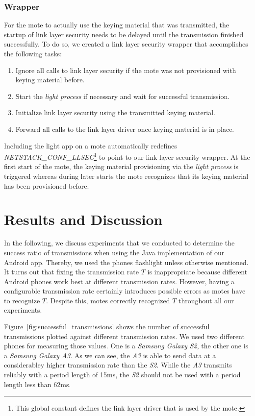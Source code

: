 \documentclass{ewsn-proc} %
\begin{document}
\subsubsection{Wrapper}
\label{ssub:contiki_driver_wrapper}

For the mote to actually use the keying material that was transmitted, the startup of link layer security needs to be delayed until the transmission finished successfully.
To do so, we created a link layer security wrapper that accomplishes the following tasks:

\begin{enumerate}
	\item Ignore all calls to link layer security if the mote was not provisioned with keying material before.
	\item Start the \textit{light process} if necessary and wait for successful transmission.
	\item Initialize link layer security using the transmitted keying material.
	\item Forward all calls to the link layer driver once keying material is in place.
\end{enumerate}

Including the light app on a mote automatically redefines \textit{NETSTACK\_CONF\_LLSEC}\footnote{This global constant defines the link layer driver that is used by the mote.} to point to our link layer security wrapper.
At the first start of the mote, the keying material provisioning via the \textit{light process} is triggered whereas during later starts the mote recognizes that its keying material has been provisioned before.


\section{Results and Discussion}
\label{sec:results_and_discussion}

In the following, we discuss experiments that we conducted to determine the success ratio of transmissions when using the Java implementation of our Android app.
Thereby, we used the phones flashlight unless otherwise mentioned.
It turns out that fixing the transmission rate $T$ is inappropriate because different Android phones work best at different transmission rates. 
However, having a configurable transmission rate certainly introduces possible errors as motes have to recognize $T$. 
Despite this, motes correctly recognized $T$ throughout all our experiments.

Figure~\ref{fig:successful_transmissions} shows the number of successful transmissions plotted against different transmission rates.
We used two different phones for measuring those values.
One is a \textit{Samsung Galaxy S2}, the other one is a \textit{Samsung Galaxy A3}.
As we can see, the \textit{A3} is able to send data at a considerabley higher transmission rate than the \textit{S2}.
While the \textit{A3} transmits reliably with a period length of 15ms, the \textit{S2} should not be used with a period length less than 62ms.
\end{document}
